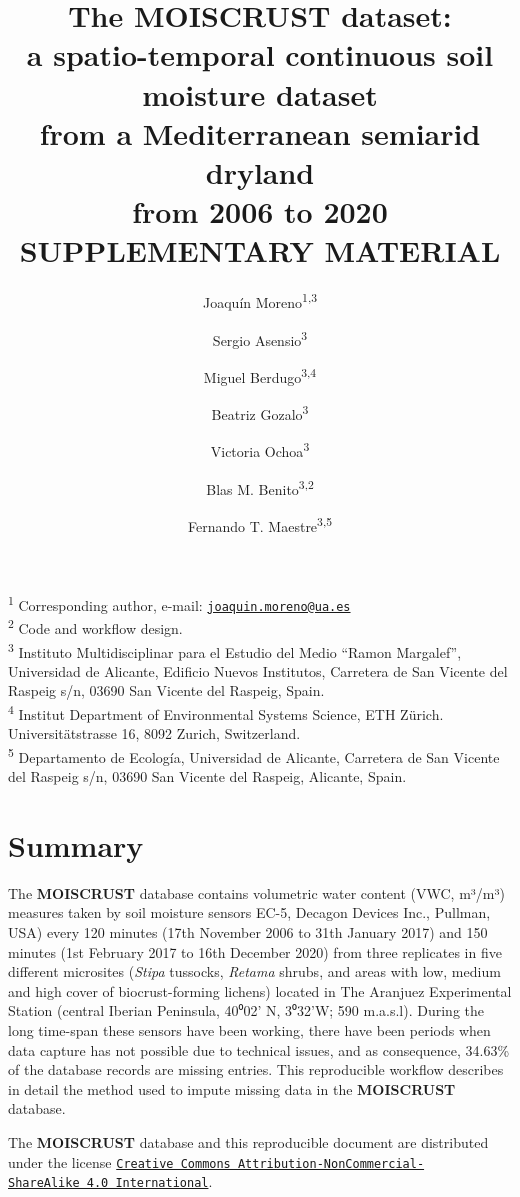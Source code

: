 \documentclass[]{article}
\title{The MOISCRUST dataset:\\
a spatio-temporal continuous soil moisture dataset\\
from a Mediterranean semiarid dryland\\
from 2006 to 2020\\
SUPPLEMENTARY MATERIAL}
\author{Joaquín Moreno\textsuperscript{1,3} \and Sergio Asensio\textsuperscript{3} \and Miguel Berdugo\textsuperscript{3,4} \and Beatriz Gozalo\textsuperscript{3} \and Victoria Ochoa\textsuperscript{3} \and Blas M. Benito\textsuperscript{3,2} \and Fernando T. Maestre\textsuperscript{3,5}}
\date{}
\begin{document}
\maketitle

{
\setcounter{tocdepth}{1}
\tableofcontents
}
\textsuperscript{1} Corresponding author, e-mail:
\href{mailto:joaquin.moreno@ua.es}{\nolinkurl{joaquin.moreno@ua.es}}\\
\textsuperscript{2} Code and workflow design.\\
\textsuperscript{3} Instituto Multidisciplinar para el Estudio del Medio
``Ramon Margalef'', Universidad de Alicante, Edificio Nuevos Institutos,
Carretera de San Vicente del Raspeig s/n, 03690 San Vicente del Raspeig,
Spain.\\
\textsuperscript{4} Institut Department of Environmental Systems
Science, ETH Zürich. Universitätstrasse 16, 8092 Zurich, Switzerland.\\
\textsuperscript{5} Departamento de Ecología, Universidad de Alicante,
Carretera de San Vicente del Raspeig s/n, 03690 San Vicente del Raspeig,
Alicante, Spain.

\newpage

\hypertarget{summary}{%
\section{Summary}\label{summary}}

The \textbf{MOISCRUST} database contains volumetric water content (VWC,
m³/m³) measures taken by soil moisture sensors EC-5, Decagon Devices
Inc., Pullman, USA) every 120 minutes (17th November 2006 to 31th
January 2017) and 150 minutes (1st February 2017 to 16th December 2020)
from three replicates in five different microsites (\emph{Stipa}
tussocks, \emph{Retama} shrubs, and areas with low, medium and high
cover of biocrust-forming lichens) located in The Aranjuez Experimental
Station (central Iberian Peninsula, 40⁰02' N, 3⁰32'W; 590 m.a.s.l).
During the long time-span these sensors have been working, there have
been periods when data capture has not possible due to technical issues,
and as consequence, 34.63\% of the database records are missing entries.
This reproducible workflow describes in detail the method used to impute
missing data in the \textbf{MOISCRUST} database.

The \textbf{MOISCRUST} database and this reproducible document are
distributed under the license
\href{https://creativecommons.org/licenses/by/4.0/legalcode}{\texttt{Creative\ Commons\ Attribution-NonCommercial-ShareAlike\ 4.0\ International}}.
\end{document}
